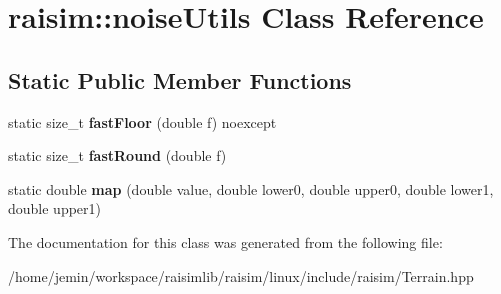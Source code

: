 \hypertarget{classraisim_1_1noiseUtils}{}\section{raisim\+:\+:noise\+Utils Class Reference}
\label{classraisim_1_1noiseUtils}
\subsection*{Static Public Member Functions}
\begin{DoxyCompactItemize}
\item 
\mbox{\label{classraisim_1_1noiseUtils_ab592bf3ec505f39b25a35e47432015a3}} 
static size\+\_\+t {\bfseries fast\+Floor} (double f) noexcept
\item 
\mbox{\label{classraisim_1_1noiseUtils_a2ed689186ce96b7d03fd766c040ec2cf}} 
static size\+\_\+t {\bfseries fast\+Round} (double f)
\item 
\mbox{\label{classraisim_1_1noiseUtils_a826b1922da011d9537d84ab2a73c0622}} 
static double {\bfseries map} (double value, double lower0, double upper0, double lower1, double upper1)
\end{DoxyCompactItemize}


The documentation for this class was generated from the following file\+:\begin{DoxyCompactItemize}
\item 
/home/jemin/workspace/raisimlib/raisim/linux/include/raisim/Terrain.\+hpp\end{DoxyCompactItemize}
